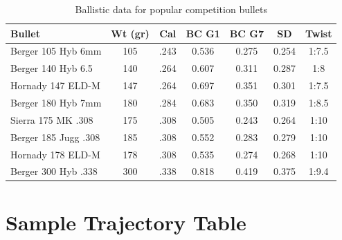 \documentclass[11pt,twoside,openright]{report}
\begin{document}
\begin{table}[H]
\centering
\caption{Ballistic data for popular competition bullets \citep{litz2015ballistic}}
\label{tab:bullet_data}
\small
\begin{tabular}{@{}lcccccc@{}}
\toprule
\textbf{Bullet} & \textbf{Wt (gr)} & \textbf{Cal} & \textbf{BC G1} & \textbf{BC G7} & \textbf{SD} & \textbf{Twist} \\
\midrule
Berger 105 Hyb 6mm & 105 & .243 & 0.536 & 0.275 & 0.254 & 1:7.5 \\
Berger 140 Hyb 6.5 & 140 & .264 & 0.607 & 0.311 & 0.287 & 1:8 \\
Hornady 147 ELD-M & 147 & .264 & 0.697 & 0.351 & 0.301 & 1:7.5 \\
Berger 180 Hyb 7mm & 180 & .284 & 0.683 & 0.350 & 0.319 & 1:8.5 \\
Sierra 175 MK .308 & 175 & .308 & 0.505 & 0.243 & 0.264 & 1:10 \\
Berger 185 Jugg .308 & 185 & .308 & 0.552 & 0.283 & 0.279 & 1:10 \\
Hornady 178 ELD-M & 178 & .308 & 0.535 & 0.274 & 0.268 & 1:10 \\
Berger 300 Hyb .338 & 300 & .338 & 0.818 & 0.419 & 0.375 & 1:9.4 \\
\bottomrule
\end{tabular}
\end{table}

\section{Sample Trajectory Table}
\end{document}
